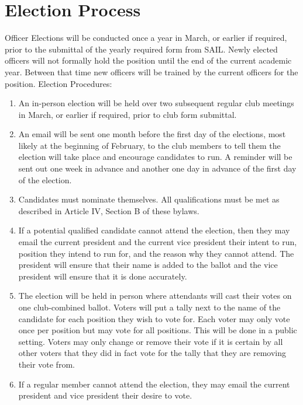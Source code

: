 \documentclass[12pt]{article}
\begin{document}
\section{Election Process}
Officer Elections will be conducted once a year in March, or earlier if required, 
prior to the submittal of the yearly required form from SAIL. 
Newly elected officers will not formally hold the position until the end of the current academic year. 
Between that time new officers will be trained by the current officers for the position.
{Election Procedures:}
\begin{enumerate}[label=(\roman*)]
    \item An in-person election will be held over two subsequent regular club meetings in March, 
    or earlier if required, prior to club form submittal. 
    \item An email will be sent one month before the first day of the elections, most likely at the beginning of February, 
    to the club members to tell them the election will take place and encourage candidates to run. 
    A reminder will be sent out one week in advance and another one day in advance of the first day of the election.
    \item Candidates must nominate themselves. 
    All qualifications must be met as described in Article IV, Section B of these bylaws. 
    \item If a potential qualified candidate cannot attend the election, 
    then they may email the current president and the current vice president their intent to run, 
    position they intend to run for, and the reason why they cannot attend. 
    The president will ensure that their name is added to the ballot and the vice president will ensure that it is done accurately.
    \item The election will be held in person where attendants will cast their votes on one club-combined ballot. 
    Voters will put a tally next to the name of the candidate for each position they wish to vote for. 
    Each voter may only vote once per position but may vote for all positions. 
    This will be done in a public setting. 
    Voters may only change or remove their vote if it is certain by all other voters that they did in fact vote for the tally that they are removing their vote from.
    \item If a regular member cannot attend the election, 
    they may email the current president and vice president their desire to vote. 

\end{enumerate}
\end{document}
